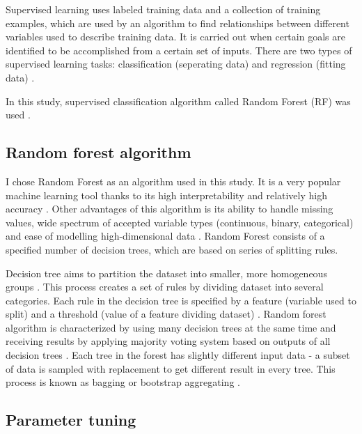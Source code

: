 \documentclass{amuthesis}
\begin{document}
Supervised learning uses labeled training data and a collection of
training examples, which are used by an algorithm to find relationships
between different variables used to describe training data. It is
carried out when certain goals are identified to be accomplished from a
certain set of inputs. There are two types of supervised learning tasks:
classification (seperating data) and regression (fitting data)
\autocite{sarker_machine_2021}.

In this study, supervised classification algorithm called Random Forest
(RF) was used \autocite{breiman_random_2001}.

\hypertarget{sec-rf}{%
\subsection{Random forest algorithm}\label{sec-rf}}

I chose Random Forest as an algorithm used in this study. It is a very
popular machine learning tool thanks to its high interpretability and
relatively high accuracy \autocite{qi_random_2012}. Other advantages of
this algorithm is its ability to handle missing values, wide spectrum of
accepted variable types (continuous, binary, categorical) and ease of
modelling high-dimensional data \autocite{qi_random_2012}. Random Forest
consists of a specified number of decision trees, which are based on
series of splitting rules.

Decision tree aims to partition the dataset into smaller, more
homogeneous groups \autocite{kuhn_applied_2013}. This process creates a
set of rules by dividing dataset into several categories. Each rule in
the decision tree is specified by a feature (variable used to split) and
a threshold (value of a feature dividing dataset)
\autocite{sekulic_random_2020}. Random forest algorithm is characterized
by using many decision trees at the same time and receiving results by
applying majority voting system based on outputs of all decision trees
\autocite{kuhn_applied_2013}. Each tree in the forest has slightly
different input data - a subset of data is sampled with replacement to
get different result in every tree. This process is known as bagging or
bootstrap aggregating \autocite{schonlau_random_2020}.

\hypertarget{sec-tuning}{%
\subsection{Parameter tuning}\label{sec-tuning}}
\end{document}
